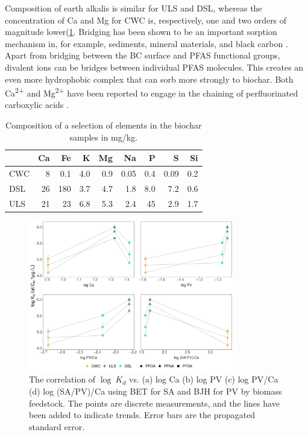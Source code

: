 Composition of earth alkalis is similar for ULS and DSL, whereas the concentration of Ca and Mg for CWC is, respectively, one and two orders of magnitude lower(\cref{tab:BC_mainElements}. Bridging has been shown to be an important sorption mechanism in, for example, sediments, mineral materials, and black carbon \citep{higgins2006sorption}. Apart from bridging between the BC surface and PFAS functional groups, divalent ions can be bridges between individual PFAS molecules. This creates an even more hydrophobic complex that can sorb more strongly to biochar. Both Ca\textsuperscript{2+} and Mg\textsuperscript{2+} have been reported to engage in the chaining of perfluorinated carboxylic acids \citep{wang2011}.


\begin{table}
\centering
\caption{Composition of a selection of elements in the biochar samples in mg/kg.}
\label{tab:BC_mainElements}
\begin{tabular}{lrrrrrrrr} \toprule
 & Ca & Fe & K & Mg & Na & P & S & Si \\ \midrule
CWC & 8 & 0.1 & 4.0 & 0.9 & 0.05 & 0.4 & 0.09 & 0.2 \\
DSL & 26 & 180 & 3.7 & 4.7 & 1.8 & 8.0 & 7.2 & 0.6 \\
ULS & 21 & 23 & 6.8 & 5.3 & 2.4 & 45 & 2.9 & 1.7 \\ \bottomrule
\end{tabular}
\end{table}

\begin{figure}[htb]
    \centering
    \includegraphics[width=0.8\textwidth]{R/figs/Correlation_SAPV_Ca_plot.pdf}
    \caption{The correlation of $\log~K_d$ vs. (a) log Ca (b) log PV (c) log PV/Ca (d) log (SA/PV)/Ca using BET for SA and BJH for PV by biomass feedstock. The points are discrete measurements, and the lines have been added to indicate trends. Error bars are the propagated standard error.}
    \label{fig:Kd_SAPV_Ca}
\end{figure}

